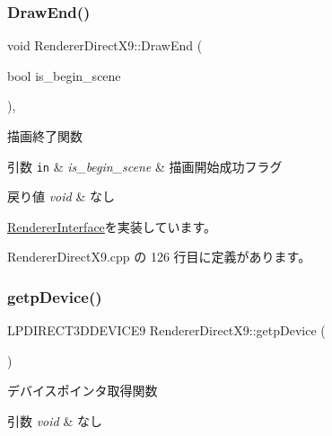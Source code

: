 \subsubsection{\texorpdfstring{Draw\+End()}{DrawEnd()}}
{\footnotesize\ttfamily void Renderer\+Direct\+X9\+::\+Draw\+End (\begin{DoxyParamCaption}\item[{bool}]{is\+\_\+begin\+\_\+scene }\end{DoxyParamCaption})\hspace{0.3cm}{\ttfamily [override]}, {\ttfamily [virtual]}}



描画終了関数 


\begin{DoxyParams}[1]{引数}
\mbox{\tt in}  & {\em is\+\_\+begin\+\_\+scene} & 描画開始成功フラグ \\
\hline
\end{DoxyParams}

\begin{DoxyRetVals}{戻り値}
{\em void} & なし \\
\hline
\end{DoxyRetVals}


\mbox{\hyperlink{class_renderer_interface_a0034a44420e4746062e70e4d66d3bee2}{Renderer\+Interface}}を実装しています。



 Renderer\+Direct\+X9.\+cpp の 126 行目に定義があります。

\mbox{\label{class_renderer_direct_x9_afabcea127b5af61e4d80564369e72baa}} 
\subsubsection{\texorpdfstring{getp\+Device()}{getpDevice()}}
{\footnotesize\ttfamily L\+P\+D\+I\+R\+E\+C\+T3\+D\+D\+E\+V\+I\+C\+E9 Renderer\+Direct\+X9\+::getp\+Device (\begin{DoxyParamCaption}{ }\end{DoxyParamCaption})}



デバイスポインタ取得関数 


\begin{DoxyParams}{引数}
{\em void} & なし \\
\hline
\end{DoxyParams}

